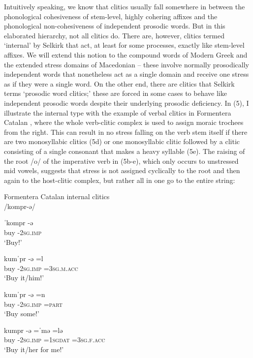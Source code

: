 \documentclass[output=paper,
modfonts
]{LSP/langsci}
\begin{document}
\noindent Intuitively speaking, we know that clitics usually fall somewhere in between the phonological cohesiveness of stem-level, highly cohering affixes and the phonological non-cohesiveness of independent prosodic words. But in this elaborated hierarchy, not all clitics do. There are, however, clitics termed ‘internal’ by Selkirk that act, at least for some processes, exactly like stem-level affixes. We will extend this notion to the compound words of Modern Greek and the extended stress domains of Macedonian -- these involve normally prosodically independent words that nonetheless act as a single domain and receive one stress as if they were a single word. On the other end, there are clitics that Selkirk terms ‘prosodic word clitics;’ these are forced in some cases to behave like independent prosodic words despite their underlying prosodic deficiency. In (5), I illustrate the internal type with the example of verbal clitics in Formentera Catalan \citep{torres-Tamarit2015}, where the whole verb-clitic complex is used to assign moraic trochees from the right. This can result in no stress falling on the verb stem itself if there are two monosyllabic clitics (5d) or one monosyllabic clitic followed by a clitic consisting of a single consonant that makes a heavy syllable (5e). The raising of the root /o/ of the imperative verb in (5b-e), which only occurs to unstressed mid vowels, suggests that stress is not assigned cyclically to the root and then again to the host-clitic complex, but rather all in one go to the entire string:

\ea Formentera Catalan  \citep{torres-Tamarit2015} internal clitics\\
/kompr-ə/ 

	\ea	\gll ˈkompr \squish-ə  \\
		buy \squish-\textsc{2sg.imp}\\
		\glt `Buy!'

	\ex	\gll kumˈpr \squish-ə  \squish=l\\
		buy \squish-\textsc{2sg.imp} \squish=\textsc{3sg.m.acc}\\
		\glt `Buy it/him!'

	\ex	\gll kumˈpr \squish-ə  \squish=n\\ 
		buy \squish-\textsc{2sg.imp} \squish\textsc{=part}\\
		\glt `Buy some!'

	\ex	\gll kumpr \squish-ə \squish=ˈmə \squish=lə \\
		buy \squish\textsc{-2sg.imp} \squish\textsc{=1sgdat} \squish\textsc{=3sg.f.acc}\\
		\glt `Buy it/her for me!'
\end{document}
